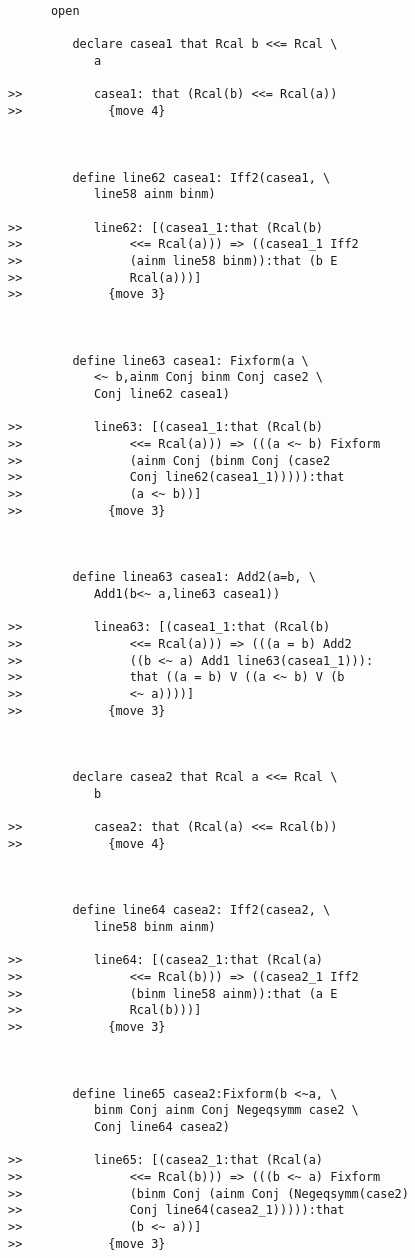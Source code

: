\documentclass[12pt]{article}
\begin{document}
\begin{verbatim}
      open

         declare casea1 that Rcal b <<= Rcal \
            a

>>          casea1: that (Rcal(b) <<= Rcal(a))
>>            {move 4}



         define line62 casea1: Iff2(casea1, \
            line58 ainm binm)

>>          line62: [(casea1_1:that (Rcal(b)
>>               <<= Rcal(a))) => ((casea1_1 Iff2
>>               (ainm line58 binm)):that (b E
>>               Rcal(a)))]
>>            {move 3}



         define line63 casea1: Fixform(a \
            <~ b,ainm Conj binm Conj case2 \
            Conj line62 casea1)

>>          line63: [(casea1_1:that (Rcal(b)
>>               <<= Rcal(a))) => (((a <~ b) Fixform
>>               (ainm Conj (binm Conj (case2
>>               Conj line62(casea1_1))))):that
>>               (a <~ b))]
>>            {move 3}



         define linea63 casea1: Add2(a=b, \
            Add1(b<~ a,line63 casea1))

>>          linea63: [(casea1_1:that (Rcal(b)
>>               <<= Rcal(a))) => (((a = b) Add2
>>               ((b <~ a) Add1 line63(casea1_1))):
>>               that ((a = b) V ((a <~ b) V (b
>>               <~ a))))]
>>            {move 3}



         declare casea2 that Rcal a <<= Rcal \
            b

>>          casea2: that (Rcal(a) <<= Rcal(b))
>>            {move 4}



         define line64 casea2: Iff2(casea2, \
            line58 binm ainm)

>>          line64: [(casea2_1:that (Rcal(a)
>>               <<= Rcal(b))) => ((casea2_1 Iff2
>>               (binm line58 ainm)):that (a E
>>               Rcal(b)))]
>>            {move 3}



         define line65 casea2:Fixform(b <~a, \
            binm Conj ainm Conj Negeqsymm case2 \
            Conj line64 casea2)

>>          line65: [(casea2_1:that (Rcal(a)
>>               <<= Rcal(b))) => (((b <~ a) Fixform
>>               (binm Conj (ainm Conj (Negeqsymm(case2)
>>               Conj line64(casea2_1))))):that
>>               (b <~ a))]
>>            {move 3}




\end{verbatim}
\end{document}
